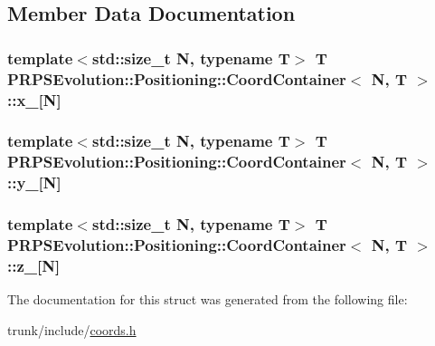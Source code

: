\subsection{\-Member \-Data \-Documentation}
\hypertarget{struct_p_r_p_s_evolution_1_1_positioning_1_1_coord_container_ae6e996f4a81e981d860985c2f949b405}{
\subsubsection[{x\-\_\-}]{\setlength{\rightskip}{0pt plus 5cm}template$<$std\-::size\-\_\-t \-N, typename \-T$>$ \-T {\bf \-P\-R\-P\-S\-Evolution\-::\-Positioning\-::\-Coord\-Container}$<$ \-N, \-T $>$\-::{\bf x\-\_\-}\mbox{[}\-N\mbox{]}}}\label{struct_p_r_p_s_evolution_1_1_positioning_1_1_coord_container_ae6e996f4a81e981d860985c2f949b405}
\hypertarget{struct_p_r_p_s_evolution_1_1_positioning_1_1_coord_container_a2918ecaef01a1b583c59584db2a32250}{
\subsubsection[{y\-\_\-}]{\setlength{\rightskip}{0pt plus 5cm}template$<$std\-::size\-\_\-t \-N, typename \-T$>$ \-T {\bf \-P\-R\-P\-S\-Evolution\-::\-Positioning\-::\-Coord\-Container}$<$ \-N, \-T $>$\-::{\bf y\-\_\-}\mbox{[}\-N\mbox{]}}}\label{struct_p_r_p_s_evolution_1_1_positioning_1_1_coord_container_a2918ecaef01a1b583c59584db2a32250}
\hypertarget{struct_p_r_p_s_evolution_1_1_positioning_1_1_coord_container_aef9d7962c3ed093cd97f502ac70d254d}{
\subsubsection[{z\-\_\-}]{\setlength{\rightskip}{0pt plus 5cm}template$<$std\-::size\-\_\-t \-N, typename \-T$>$ \-T {\bf \-P\-R\-P\-S\-Evolution\-::\-Positioning\-::\-Coord\-Container}$<$ \-N, \-T $>$\-::{\bf z\-\_\-}\mbox{[}\-N\mbox{]}}}\label{struct_p_r_p_s_evolution_1_1_positioning_1_1_coord_container_aef9d7962c3ed093cd97f502ac70d254d}


\-The documentation for this struct was generated from the following file\-:\begin{DoxyCompactItemize}
\item 
trunk/include/\hyperlink{coords_8h}{coords.\-h}\end{DoxyCompactItemize}
